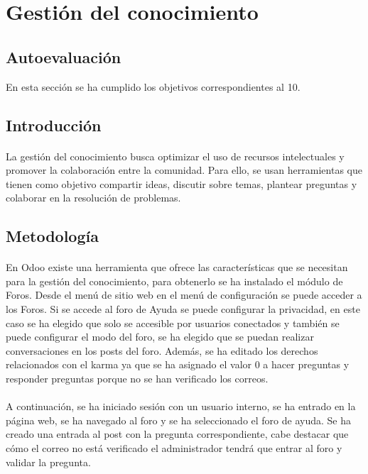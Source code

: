 \section{Gestión del conocimiento}
\subsection{Autoevaluación}
En esta sección se ha cumplido los objetivos correspondientes al 10.
\subsection{Introducción}
\paragraph{}
La gestión del conocimiento busca optimizar el uso de recursos intelectuales y promover la colaboración entre la comunidad. Para ello, se usan herramientas que tienen como objetivo compartir ideas, discutir sobre temas, plantear preguntas y colaborar en la resolución de problemas.
\subsection{Metodología}
\paragraph{}
En Odoo existe una herramienta que ofrece las características que se necesitan para la gestión del conocimiento, para obtenerlo se ha instalado el módulo de Foros. Desde el menú de sitio web en el menú de configuración se puede acceder a los Foros. Si se accede al foro de Ayuda se puede configurar la privacidad, en este caso se ha elegido que solo se accesible por usuarios conectados y también se puede configurar el modo del foro, se ha elegido que se puedan realizar conversaciones en los posts del foro. Además, se ha editado los derechos relacionados con el karma ya que se ha asignado el valor 0 a hacer preguntas y responder preguntas porque no se han verificado los correos. 
\paragraph{}
A continuación, se ha iniciado sesión con un usuario interno, se ha entrado en la página web, se ha navegado al foro y se ha seleccionado el foro de ayuda. Se ha creado una entrada al post con la pregunta correspondiente, cabe destacar que cómo el correo no está verificado el administrador tendrá que entrar al foro y validar la pregunta.
